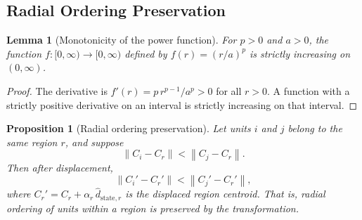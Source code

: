 \documentclass[12pt, a4paper]{article}
\numberwithin{equation}{section}
\theoremstyle{definition}
\theoremstyle{plain}
\newtheorem{proposition}{Proposition}[section]
\newtheorem{lemma}{Lemma}[section]
\theoremstyle{remark}
\newcommand{\norm}[1]{\left\|#1\right\|}
\begin{document}
\subsection{Radial Ordering Preservation}

\begin{lemma}[Monotonicity of the power function]
\label{lem:monotone}
For $p > 0$ and $a > 0$, the function $f: [0, \infty) \to [0, \infty)$ defined by $f(r) = (r/a)^p$ is strictly increasing on $(0, \infty)$.
\end{lemma}

\begin{proof}
The derivative is $f'(r) = p\,r^{p-1}/a^p > 0$ for all $r > 0$. A function with a strictly positive derivative on an interval is strictly increasing on that interval.
\end{proof}

\begin{proposition}[Radial ordering preservation]
\label{prop:ordering}
Let units $i$ and $j$ belong to the same region $r$, and suppose
\[
  \norm{C_i - C_r} < \norm{C_j - C_r}.
\]
Then after displacement,
\[
  \norm{C_i' - C_r'} < \norm{C_j' - C_r'},
\]
where $C_r' = C_r + \alpha_r\,\hat{d}_{\text{state},r}$ is the displaced region centroid. That is, radial ordering of units within a region is preserved by the transformation.
\end{proposition}
\end{document}

